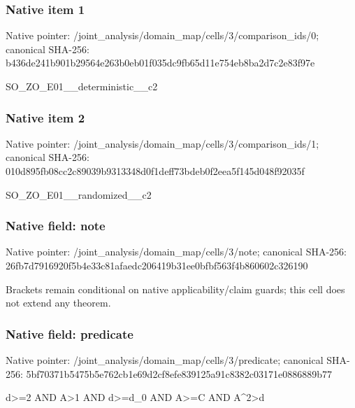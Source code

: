 \documentclass[10pt,a4paper]{article}
\begin{document}
\subsubsection{Native item 1}
Native pointer: /joint\_\allowbreak{}analysis/domain\_\allowbreak{}map/cells/3/comparison\_\allowbreak{}ids/0; canonical SHA-256: b436de241b901b29564e263b0eb01f035dc9fb65d11e754eb8ba2d7c2e83f97e

\begingroup\raggedright\sloppy SO\_\allowbreak{}ZO\_\allowbreak{}E01\_\allowbreak{}\_\allowbreak{}deterministic\_\allowbreak{}\_\allowbreak{}c2\par\endgroup

\subsubsection{Native item 2}
Native pointer: /joint\_\allowbreak{}analysis/domain\_\allowbreak{}map/cells/3/comparison\_\allowbreak{}ids/1; canonical SHA-256: 010d895fb08cc2c89039b9313348d0f1deff73bdeb0f2eea5f145d048f92035f

\begingroup\raggedright\sloppy SO\_\allowbreak{}ZO\_\allowbreak{}E01\_\allowbreak{}\_\allowbreak{}randomized\_\allowbreak{}\_\allowbreak{}c2\par\endgroup

\subsubsection{Native field: note}
Native pointer: /joint\_\allowbreak{}analysis/domain\_\allowbreak{}map/cells/3/note; canonical SHA-256: 26fb7d7916920f5b4e33c81afaedc206419b31ee0bfbf563f4b860602c326190

\begingroup\raggedright\sloppy Brackets remain conditional on native applicability/\allowbreak{}claim guards;\allowbreak{} this cell does not extend any theorem.\par\endgroup

\subsubsection{Native field: predicate}
Native pointer: /joint\_\allowbreak{}analysis/domain\_\allowbreak{}map/cells/3/predicate; canonical SHA-256: 5bf70371b5475b5e762cb1e69d2cf8efe839125a91c8382c03171e0886889b77

\begingroup\raggedright\sloppy d>=\allowbreak{}2 AND A>1 AND d>=\allowbreak{}d\_\allowbreak{}0 AND A>=\allowbreak{}C AND A\textasciicircum{}2>d\par\endgroup
\end{document}
